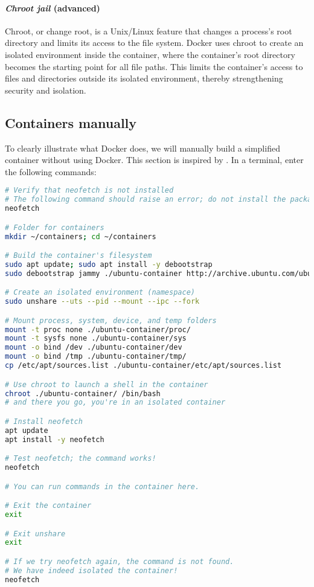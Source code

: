 \documentclass[french]{article}
\begin{document}
\paragraph{\textit{Chroot jail} (advanced)}
Chroot, or change root, is a Unix/Linux feature that changes a process’s root directory and limits its access to the file system.
Docker uses chroot to create an isolated environment inside the container, where the container’s root directory becomes the starting point for all file paths.
This limits the container’s access to files and directories outside its isolated environment, thereby strengthening security and isolation.

\subsection{Containers manually}

To clearly illustrate what Docker does, we will manually build a simplified container without using Docker.
This section is inspired by \cite{rajpurohit2023docker}.
In a terminal, enter the following commands:

\begin{lstlisting}[language=bash]
# Verify that neofetch is not installed
# The following command should raise an error; do not install the package
neofetch

# Folder for containers
mkdir ~/containers; cd ~/containers

# Build the container's filesystem
sudo apt update; sudo apt install -y debootstrap
sudo debootstrap jammy ./ubuntu-container http://archive.ubuntu.com/ubuntu/

# Create an isolated environment (namespace)
sudo unshare --uts --pid --mount --ipc --fork

# Mount process, system, device, and temp folders
mount -t proc none ./ubuntu-container/proc/
mount -t sysfs none ./ubuntu-container/sys
mount -o bind /dev ./ubuntu-container/dev
mount -o bind /tmp ./ubuntu-container/tmp/
cp /etc/apt/sources.list ./ubuntu-container/etc/apt/sources.list

# Use chroot to launch a shell in the container
chroot ./ubuntu-container/ /bin/bash
# and there you go, you're in an isolated container

# Install neofetch
apt update
apt install -y neofetch

# Test neofetch; the command works!
neofetch

# You can run commands in the container here.

# Exit the container
exit

# Exit unshare
exit

# If we try neofetch again, the command is not found.
# We have indeed isolated the container!
neofetch
\end{lstlisting}
\end{document}
